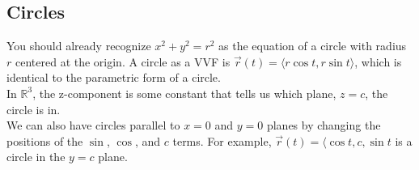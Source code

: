 \subsection{Circles}
\noindent
You should already recognize $x^2 + y^2 = r^2$ as the equation of a circle with radius $r$ centered at the origin. A circle as a VVF is $\vec{r}(t) = \langle r\cos{t}, r\sin{t} \rangle$, which is identical to the parametric form of a circle.\\
In $\mathbb{R}^3$, the z-component is some constant that tells us which plane, $z=c$, the circle is in.\\ 
We can also have circles parallel to $x=0$ and $y=0$ planes by changing the positions of the $\sin$, $\cos$, and $c$ terms. For example, $\vec{r}(t) = \langle \cos{t}, c, \sin{t}$ is a circle in the $y=c$ plane.